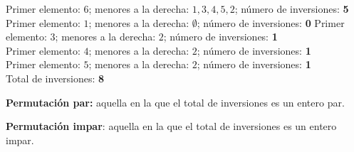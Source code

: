 Primer elemento: $6$; menores a la derecha: $1,3,4,5,2$; n\'umero de
inversiones: \textbf{5}
Primer elemento: $1$; menores a la derecha: $\emptyset$; n\'umero de
inversiones: \textbf{0}
Primer elemento: $3$; menores a la derecha: $2$; n\'umero de inversiones:
\textbf{1}\\
Primer elemento: $4$; menores a la derecha: $2$; n\'umero de inversiones:
\textbf{1}\\
Primer elemento: $5$; menores a la derecha: $2$; n\'umero de inversiones:
\textbf{1}\\

Total de inversiones: \textbf{8}
\begin{tcolorbox}[colback=blue!5!white,colframe=blue!60!black,title=Definición: Tipos de permutaciones]
	\textbf{Permutaci\'on par:} aquella en la que el total de inversiones es un
	entero par.
	
	\tcblower

	\textbf{Permutaci\'on impar}: aquella en la que el total de inversiones es un
	entero impar.
	
\end{tcolorbox}
